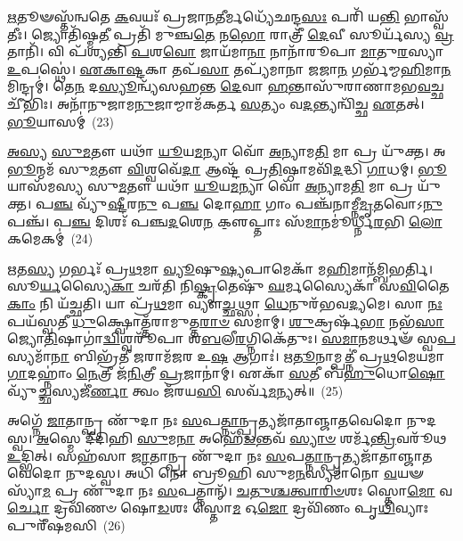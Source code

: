 \-\ul{𑌋}\-𑌤𑍂𑍟𑌸𑍍𑌤᳴𑌨𑍍𑌵𑌤𑍇 \ul{𑌕}\-𑌵𑌯𑌃᳴ 𑌪𑍍𑌰𑌜𑌾\-\ul{𑌨}\-𑌤𑍀𑌰𑍍𑌮𑌧𑍍𑌯𑍇᳴𑌛𑌨𑍍𑌦\-\ul{𑌸𑌃} 𑌪𑌰𑌿᳴ 𑌯\-\ul{𑌨𑍍𑌤𑌿} 𑌭𑌾𑌸𑍍𑌵᳴𑌤𑍀𑌃। 𑌜𑍍𑌯𑍋𑌤𑌿᳴𑌷𑍍𑌮\-\ul{𑌤𑍀} 𑌪𑍍𑌰𑌤𑌿᳴ 𑌮𑍁𑌞𑍍𑌚\-\ul{𑌤𑍇} 𑌨\-\ul{𑌭𑍋} 𑌰𑌾𑌤𑍍𑌰𑍀᳴ \ul{𑌦𑍇}\-𑌵𑍀 𑌸𑍂𑌰𑍍𑌯᳴𑌸𑍍𑌯 \ul{𑌵𑍍𑌰}\-𑌤𑌾𑌨𑌿᳴। 𑌵𑌿 𑌪᳴𑌶𑍍𑌯𑌨𑍍𑌤𑌿 \ul{𑌪}\-𑌶\-\ul{𑌵𑍋} 𑌜𑌾𑌯᳴𑌮𑌾\-\ul{𑌨𑌾} 𑌨𑌾𑌨𑌾᳴𑌰𑍂𑌪𑌾 \ul{𑌮𑌾}\-𑌤𑍁\-\ul{𑌰}\-𑌸𑍍𑌯𑌾 \ul{𑌉}\-𑌪𑌸𑍍𑌥𑍇॑। \ul{𑌏}\-\-\ul{𑌕𑌾}\-\-\ul{𑌷𑍍𑌟}\-𑌕𑌾 𑌤𑌪᳴\-\ul{𑌸𑌾} 𑌤𑌪𑍍𑌯᳴𑌮𑌾𑌨𑌾 \ul{𑌜}\-𑌜𑌾\-\ul{𑌨} 𑌗𑌰𑍍𑌭᳴𑌮𑍍𑌮\-\ul{𑌹𑌿}\-𑌮𑌾\-\ul{𑌨}\-𑌮𑌿𑌨𑍍𑌦𑍍𑌰𑌮𑍍॑। 𑌤𑍇\-\ul{𑌨} 𑌦\-\ul{𑌸𑍍𑌯𑍂}\-𑌨𑍍𑌵𑍍𑌯᳴𑌸𑌹𑌨𑍍𑌤 \ul{𑌦𑍇}\-𑌵𑌾 \ul{𑌹}\-𑌨𑍍𑌤𑌾𑌸𑍁᳴𑌰𑌾𑌣𑌾𑌮𑌭\-\ul{𑌵}\-𑌚𑍍𑌛𑌚𑍀᳴𑌭𑌿𑌃। 𑌅𑌨𑌾᳴𑌨𑍁𑌜𑌾𑌮\-\ul{𑌨𑍁}\-𑌜𑌾𑌮𑍍𑌮𑌾𑌮᳴𑌕𑌰𑍍𑌤 \ul{𑌸}\-𑌤𑍍𑌯𑌂 𑌵\-\ul{𑌦}\-𑌨𑍍𑌤𑍍𑌯𑌨𑍍𑌵𑌿᳴𑌚𑍍𑌛 \ul{𑌏}\-𑌤𑌤𑍍। \ul{𑌭𑍂}\-𑌯𑌾𑌸𑌮𑍍॑~(23)

\-\ul{𑌅}\-\-\ul{𑌸𑍍𑌯} \ul{𑌸𑍁}\-\-\ul{𑌮}\-𑌤𑍗 𑌯𑌥𑌾᳴ \ul{𑌯𑍂}\-𑌯\-\ul{𑌮}\-𑌨𑍍𑌯𑌾 𑌵𑍋᳴ \ul{𑌅}\-𑌨𑍍𑌯𑌾𑌮\-\ul{𑌤𑌿} 𑌮𑌾 𑌪𑍍𑌰 𑌯𑍁᳴𑌕𑍍𑌤। 𑌅\-\ul{𑌭𑍂}\-𑌨𑍍𑌮𑌮᳴ 𑌸𑍁\-\ul{𑌮}\-𑌤𑍗 \ul{𑌵𑌿}\-𑌶𑍍𑌵𑌵𑍇᳴\-\ul{𑌦𑌾} 𑌆𑌷𑍍𑌟᳴ 𑌪𑍍𑌰\-\ul{𑌤𑌿}\-𑌷𑍍𑌠𑌾𑌮𑌵𑌿᳴\-\ul{𑌦}\-𑌦𑍍𑌧𑌿 \ul{𑌗𑌾}\-𑌧𑌮𑍍। \ul{𑌭𑍂}\-𑌯𑌾𑌸᳴𑌮𑌸𑍍𑌯 𑌸𑍁\-\ul{𑌮}\-𑌤𑍗 𑌯𑌥𑌾᳴ \ul{𑌯𑍂}\-𑌯\-\ul{𑌮}\-𑌨𑍍𑌯𑌾 𑌵𑍋᳴ \ul{𑌅}\-𑌨𑍍𑌯𑌾𑌮\-\ul{𑌤𑌿} 𑌮𑌾 𑌪𑍍𑌰 𑌯𑍁᳴𑌕𑍍𑌤। 𑌪\-\ul{𑌞𑍍𑌚} 𑌵𑍍𑌯𑍁᳴\-\ul{𑌷𑍍𑌟𑍀}\-𑌰\-\ul{𑌨𑍁} 𑌪\-\ul{𑌞𑍍𑌚} 𑌦𑍋\-\ul{𑌹𑌾} 𑌗𑌾𑌂 𑌪𑌞𑍍𑌚᳴𑌨𑌾𑌮𑍍𑌨𑍀\-\ul{𑌮𑍃}\-𑌤𑌵𑍋\-𑌽\-\ul{𑌨𑍁} 𑌪𑌞𑍍𑌚᳴। 𑌪\-\ul{𑌞𑍍𑌚} 𑌦𑌿𑌶𑌃᳴ 𑌪𑌞𑍍𑌚\-\ul{𑌦}\-𑌶𑍇\-\ul{𑌨} 𑌕𑍢॒𑌪𑍍𑌤𑌾𑌃 𑌸᳴\-\ul{𑌮𑌾}\-𑌨𑌮𑍂॑𑌰𑍍𑌧𑍍𑌨𑍀\-\ul{𑌰}\-𑌭𑌿 \ul{𑌲𑍋}\-𑌕𑌮𑍇𑌕𑌮𑍍॑~(24)

\-\ul{𑌋}\-𑌤\-\ul{𑌸𑍍𑌯} 𑌗𑌰𑍍𑌭𑌃᳴ 𑌪𑍍𑌰\-\ul{𑌥}\-𑌮𑌾 \ul{𑌵𑍍𑌯𑍂}\-𑌷𑍁\-\ul{𑌷𑍍𑌯}\-𑌪𑌾𑌮𑍇𑌕𑌾᳴ 𑌮\-\ul{𑌹𑌿}\-𑌮𑌾𑌨᳴𑌮𑍍𑌬𑌿𑌭𑌰𑍍𑌤𑌿। 𑌸𑍂\-\ul{𑌰𑍍𑌯}\-𑌸𑍍𑌯𑍈\-\ul{𑌕𑌾} 𑌚𑌰᳴𑌤𑌿 𑌨𑌿\-\ul{𑌷𑍍𑌕𑍃}\-𑌤𑍇𑌷𑍁᳴ \ul{𑌘}\-𑌰𑍍𑌮𑌸𑍍𑌯𑍈𑌕𑌾᳴ 𑌸\-\ul{𑌵𑌿}\-𑌤𑍈\-\ul{𑌕𑌾𑌂} 𑌨𑌿 𑌯᳴𑌚𑍍𑌛𑌤𑌿। 𑌯𑌾 𑌪𑍍𑌰᳴\-\ul{𑌥}\-𑌮𑌾 𑌵𑍍𑌯𑍗\-\ul{𑌚𑍍𑌛}\-𑌥𑍍𑌸𑌾 \ul{𑌧𑍇}\-𑌨𑍁𑌰᳴𑌭𑌵\-\ul{𑌦𑍍𑌯}\-𑌮𑍇। 𑌸𑌾 \ul{𑌨𑌃} 𑌪𑌯᳴𑌸𑍍𑌵𑌤𑍀 \ul{𑌧𑍁}\-𑌕𑍍𑌷𑍍𑌵𑍋𑌤𑍍𑌤᳴𑌰𑌾𑌮𑍁𑌤𑍍𑌤\-\ul{𑌰𑌾}\-\-\ul{𑍞} 𑌸𑌮𑌾॑𑌮𑍍। \ul{𑌶𑍁}\-𑌕𑍍𑌰𑌰𑍍\mbox{}𑌷᳴\-\ul{𑌭𑌾} 𑌨𑌭᳴\-\ul{𑌸𑌾} 𑌜𑍍𑌯𑍋\-\ul{𑌤𑌿}\-𑌷𑌾𑌗𑌾॑\-\ul{𑌦𑍍𑌵𑌿}\-𑌶𑍍𑌵𑌰𑍂᳴𑌪𑌾 𑌶\-\ul{𑌬}\-𑌲𑍀\-\ul{𑌰}\-𑌗𑍍𑌨𑌿𑌕𑍇᳴𑌤𑍁𑌃। \ul{𑌸}\-\-\ul{𑌮𑌾}\-𑌨𑌮𑌰𑍍𑌥𑍟᳴ 𑌸𑍍𑌵\-\ul{𑌪}\-𑌸𑍍𑌯𑌮𑌾᳴\-\ul{𑌨𑌾} 𑌬𑌿𑌭𑍍𑌰᳴𑌤𑍀 \ul{𑌜}\-𑌰𑌾𑌮᳴𑌜𑌰 𑌉\-\ul{𑌷} 𑌆𑌗𑌾𑌃॑। \ul{𑌋}\-\-\ul{𑌤𑍂}\-𑌨𑌾𑌮𑍍𑌪𑌤𑍍𑌨𑍀॑ 𑌪𑍍𑌰\-\ul{𑌥}\-𑌮𑍇𑌯𑌮𑌾\-\ul{𑌗𑌾}\-𑌦𑌹𑍍𑌨𑌾𑌂॑ \ul{𑌨𑍇}\-𑌤𑍍𑌰𑍀 𑌜᳴\-\ul{𑌨𑌿}\-𑌤𑍍𑌰𑍀 \ul{𑌪𑍍𑌰}\-𑌜𑌾𑌨𑌾॑𑌮𑍍। 𑌏𑌕𑌾᳴ \ul{𑌸}\-𑌤𑍀 𑌬᳴\-\ul{𑌹𑍁}\-𑌧𑍋\-\ul{𑌷𑍋} 𑌵𑍍𑌯𑍁᳴\-\ul{𑌚𑍍𑌛}\-𑌸𑍍𑌯𑌜𑍀॑\-\ul{𑌰𑍍𑌣𑌾} 𑌤𑍍𑌵𑌂 𑌜᳴𑌰𑌯\-\ul{𑌸𑌿} 𑌸𑌰𑍍𑌵᳴\-\ul{𑌮}\-𑌨𑍍𑌯𑌤𑍍॥~(25)

{\anuvakamend[{𑌊\-\ul{𑌰𑍍𑌜}\-𑌮𑍇𑌕𑌾॑ 𑌪𑍍𑌰𑌤𑌿\-\ul{𑌮𑍁}\-𑌞𑍍𑌚𑌮𑌾᳴𑌨𑌾 \ul{𑌭𑍂}\-𑌯𑌾\-\ul{𑌸}\-𑌮𑍇\-\ul{𑌕𑌂} 𑌪𑌤𑍍𑌨𑍍𑌯𑍇\-\ul{𑌕𑌾}\-𑌨𑍍𑌨𑌵𑌿𑍞᳴\-\ul{𑌶}\-𑌤𑌿𑌶𑍍𑌚᳴}]}%

𑌅𑌗𑍍𑌨𑍇᳴ \ul{𑌜𑌾}\-𑌤𑌾𑌨𑍍𑌪𑍍𑌰 𑌣𑍁᳴𑌦𑌾 𑌨𑌃 \ul{𑌸}\-𑌪\-\ul{𑌤𑍍𑌨𑌾}\-𑌨𑍍𑌪𑍍𑌰𑌤𑍍𑌯𑌜𑌾᳴𑌤𑌾𑌞𑍍𑌜𑌾𑌤𑌵𑍇𑌦𑍋 𑌨𑍁𑌦𑌸𑍍𑌵। \ul{𑌅}\-𑌸𑍍𑌮𑍇 𑌦𑍀᳴𑌦𑌿𑌹𑌿 \ul{𑌸𑍁}\-𑌮\-\ul{𑌨𑌾} 𑌅𑌹𑍇᳴\-\ul{𑌡}\-𑌨𑍍𑌤𑌵᳴ \ul{𑌸𑍍𑌯𑌾}\-\-\ul{𑍞} 𑌶𑌰𑍍𑌮᳴\-\ul{𑌨𑍍𑌤𑍍𑌰𑌿}\-𑌵𑌰𑍂᳴𑌥 \ul{𑌉}\-𑌦𑍍𑌭𑌿𑌤𑍍। 𑌸𑌹᳴𑌸𑌾 \ul{𑌜𑌾}\-𑌤𑌾𑌨𑍍𑌪𑍍𑌰 𑌣𑍁᳴𑌦𑌾 𑌨𑌃 \ul{𑌸}\-𑌪\-\ul{𑌤𑍍𑌨𑌾}\-𑌨𑍍𑌪𑍍𑌰𑌤𑍍𑌯𑌜𑌾᳴𑌤𑌾𑌞𑍍𑌜𑌾𑌤𑌵𑍇𑌦𑍋 𑌨𑍁𑌦𑌸𑍍𑌵। 𑌅𑌧𑌿᳴ 𑌨𑍋 𑌬𑍍𑌰𑍂𑌹𑌿 𑌸𑍁𑌮\-\ul{𑌨}\-𑌸𑍍𑌯𑌮𑌾᳴𑌨𑍋 \ul{𑌵}\-𑌯𑍟 𑌸𑍍𑌯𑌾᳴\-\ul{𑌮} 𑌪𑍍𑌰 𑌣𑍁᳴𑌦𑌾 𑌨𑌃 \ul{𑌸}\-𑌪𑌤𑍍𑌨𑌾𑌨𑍍᳴। \ul{𑌚}\-\-\ul{𑌤𑍁}\-\-\ul{𑌶𑍍𑌚}\-\-\ul{𑌤𑍍𑌵𑌾}\-\-\ul{𑌰𑌿}\-\-\ul{𑍞}\-𑌶𑌃 𑌸𑍍𑌤𑍋\-\ul{𑌮𑍋} 𑌵\-\ul{𑌰𑍍𑌚𑍋} 𑌦𑍍𑌰𑌵𑌿᳴𑌣𑍞 𑌷𑍋\-\ul{𑌡}\-𑌶𑌃 𑌸𑍍𑌤𑍋\-\ul{𑌮} 𑌓\-\ul{𑌜𑍋} 𑌦𑍍𑌰𑌵𑌿᳴𑌣𑌂 𑌪𑍃\-\ul{𑌥𑌿}\-𑌵𑍍𑌯𑌾𑌃 𑌪𑍁𑌰𑍀᳴𑌷𑌮𑌸𑌿~(26)

